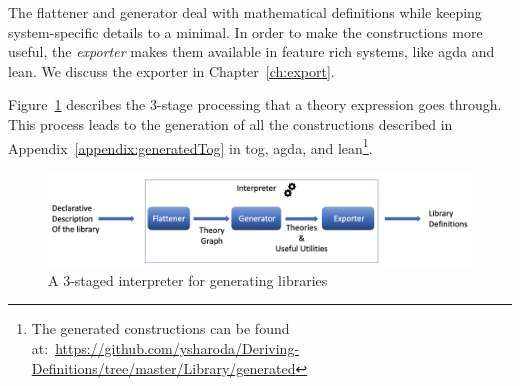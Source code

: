The flattener and generator deal with mathematical definitions while keeping system-specific details to a minimal. In order to make the constructions more useful, the \emph{exporter} makes them available in feature rich systems, like agda and lean. We discuss the exporter in Chapter~\ref{ch:export}. 

Figure~\ref{fig:staged-interpreter} describes the $3$-stage processing that a theory expression goes through. This process leads to the generation of all the constructions described in Appendix~\ref{appendix:generatedTog} in tog, agda, and lean\footnote{The generated constructions can be found at:~\url{https://github.com/ysharoda/Deriving-Definitions/tree/master/Library/generated}}. 
\begin{figure}
\includegraphics[scale=0.5,width=\linewidth]{figures/interpreter_detailed}
\caption{A $3$-staged interpreter for generating libraries}
\label{fig:staged-interpreter}
\end{figure} 

